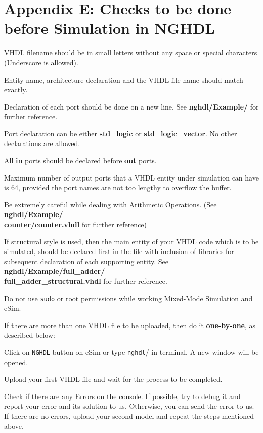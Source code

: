 \section {Appendix E: Checks to be done before Simulation in NGHDL}
\begin{compactenum}
\item VHDL filename should be in small letters without any space or special characters (Underscore is allowed).
\item Entity name, architecture declaration and the VHDL file name should match exactly.
\item Declaration of each port should be done on a new line. See \textbf{nghdl/Example/} for further reference.
\item Port declaration can be either \textbf{std\_logic} or \textbf{std\_logic\_vector}. No other declarations are allowed.
\item All \textbf{in} ports should be declared before \textbf{out} ports.
\item Maximum number of output ports that a VHDL entity under simulation can have is 64, provided the port names are not too lengthy to overflow the buffer.
\item Be extremely careful while dealing with Arithmetic Operations. (See \textbf{nghdl/Example/ \\ counter/counter.vhdl} for further reference)
\item If structural style is used, then the main entity of your VHDL code which is to be simulated,  should be declared first in the file with inclusion of libraries for subsequent declaration of each supporting entity.
See \textbf{nghdl/Example/full\_adder/ \\ full\_adder\_structural.vhdl} for further reference.
\item Do not use \texttt{sudo} or root permissions while working Mixed-Mode Simulation and eSim.
\item If there are more than one VHDL file to be uploaded, then do it \textbf{one-by-one}, as described below:
    \begin{compactenum}
    \item Click on \texttt{NGHDL} button on eSim or type \texttt{nghdl}/ in terminal. A new window will be opened.
    \item Upload your first VHDL file and wait for the process to be completed.
    \item Check if there are any Errors on the console. If possible, try to debug it and report 
        your error and its solution to us. Otherwise, you can send the error to us. If there are no errors, upload your second model and repeat the steps mentioned above. \\

\end{compactenum}
\end{compactenum}
